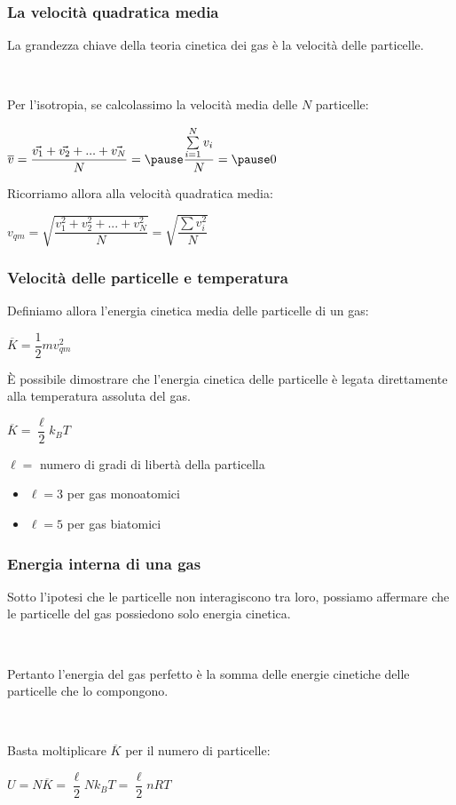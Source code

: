 \documentclass[]{beamer}
\theoremstyle{plain}
\begin{document}
\begin{frame}
\frametitle{La velocità quadratica media}
La grandezza chiave della teoria cinetica dei gas è la velocità delle particelle.\pause

~

Per l'isotropia, se calcolassimo la velocità media delle $ N $ particelle:
\begin{center}
$ \overline{v} = \dfrac{\vec{v_1} + \vec{v_2} + ... + \vec{v_N}}{N} =\pause \dfrac{\sum\limits_{i=1}^N v_i}{N} =\pause 0 $
\end{center}\pause

Ricorriamo allora alla \alert{velocità quadratica media}:
\begin{center}
\colorbox{blue!30}{$ v_{qm} = \sqrt{\dfrac{v_1^2 + v_2^2 + ... + v_N^2}{N}} = \sqrt{\dfrac{\sum v_i^2}{N}} $}
\end{center}
\end{frame}

\begin{frame}
\frametitle{Velocità delle particelle e temperatura}
Definiamo allora l'energia cinetica media delle particelle di un gas:
\begin{center}
$ \overline{K} = \dfrac{1}{2}mv_{qm}^2 $
\end{center}\pause
È possibile dimostrare che \alert{l'energia cinetica delle particelle è legata direttamente alla temperatura assoluta del gas}.
\begin{center}
\colorbox{blue!30}{$ \overline{K} = \dfrac{\ell}{2}k_B T $}
\end{center}
$ \ell = $ numero di gradi di libertà della particella
\begin{itemize}
  \item $ \ell = 3 $ per gas monoatomici
  \item$ \ell = 5 $ per gas biatomici
\end{itemize}
\end{frame}

\begin{frame}
\frametitle{Energia interna di una gas}
Sotto l'ipotesi che le particelle non interagiscono tra loro, possiamo affermare che \alert<1>{le particelle del gas possiedono solo energia cinetica}.\pause

~

Pertanto \alert<2>{l'energia del gas perfetto è la somma delle energie cinetiche} delle particelle che lo compongono.\pause

~

Basta moltiplicare $ \overline{K} $ per il numero di particelle:
\begin{center}
\colorbox{blue!30}{$ U = N\overline{K} = \dfrac{\ell}{2}Nk_B T = \dfrac{\ell}{2}nR T$}
\end{center}
\end{frame}
\end{document}
